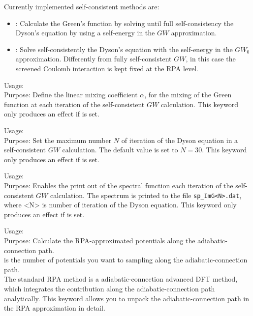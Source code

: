 Currently implemented self-consistent methods are:
\begin{itemize}
  \item {} : Calculate the Green's function by solving until full self-consistency the 
  Dyson's equation by using a self-energy in the $GW$ approximation. 
  \item {} : Solve self-consistently the Dyson's equation with the self-energy in the 
   $GW_0$ approximation. Differently from fully self-consistent $GW$, in this case the screened Coulomb 
   interaction is kept fixed at the RPA level.
\end{itemize}

{
 \noindent
  Usage:  \option{$\alpha$} \\[1.0ex]
  Purpose: Define the linear mixing coefficient $\alpha$, for the mixing of the Green function 
  at each iteration of the self-consistent $GW$ calculation.  This keyword only produces an effect if  
   is set.
}

{
 \noindent
  Usage:   \\[1.0ex]
  Purpose: Set the maximum number $N$ of iteration of the Dyson equation
  in a self-consistent $GW$ calculation. The default value is set to $N=30$. 
  This keyword only produces an effect if
   is set.
}


{
 \noindent
  Usage:  \\[1.0ex]
  Purpose: 
  Enables the print out of the spectral function each iteration of the self-consistent $GW$ calculation. 
  The spectrum is printed to the file \texttt{sp\_ImG<N>.dat}, where <N> is number of iteration of the Dyson equation. 
  This keyword only produces an effect if  is set.
}

{
 \noindent
  Usage:   \\[1.0ex]
  Purpose: Calculate the RPA-approximated potentials along the adiabatic-connection path.\\[1.0ex]
   is the number of potentials you want to sampling
  along the adiabatic-connection path.\\
}
The standard RPA method is a adiabatic-connection advanced DFT method, which
integrates the contribution along the adiabatic-connection path analytically.
This keyword  allows you to unpack the adiabatic-connection
path in the RPA approximation in detail.

